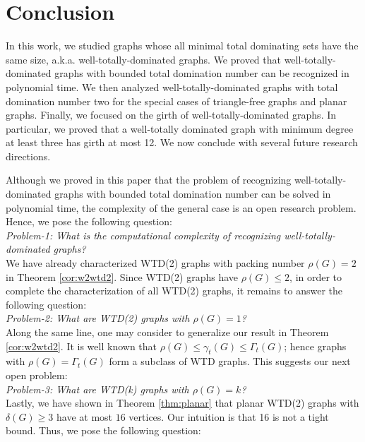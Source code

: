 \documentclass[11pt]{article}
\theoremstyle{definition}
\begin{document}
\section{Conclusion}
In this work, we studied graphs whose all minimal total dominating sets have the same size, a.k.a. well-totally-dominated graphs. We proved that well-totally-dominated graphs with bounded total domination number can be recognized in polynomial time. We then analyzed well-totally-dominated graphs with total domination number two for the special cases of triangle-free graphs and planar graphs. Finally, we focused on the girth of well-totally-dominated graphs. In particular, we proved that a well-totally dominated graph with minimum degree at least three has girth at most 12. We now conclude with several future research directions.

Although we proved in this paper that the problem of recognizing well-totally-dominated graphs with bounded total domination number can be solved in polynomial time, the complexity of the general case is an open research problem. Hence, we pose the following question:\\



\emph{Problem-1: What is the computational complexity of recognizing well-totally-dominated graphs?}\\




We have already characterized WTD(2) graphs with packing number $\rho(G)=2$ in Theorem \ref{cor:w2wtd2}. Since WTD(2) graphs have $\rho(G)\leq 2$, in order to complete the characterization of all WTD(2) graphs, it remains to answer the following question:\\

\emph{Problem-2: What are WTD(2) graphs  with  $\rho(G)=1$?}\\

Along the same line, one may consider to generalize our result in Theorem \ref{cor:w2wtd2}. It is well known that $\rho(G)\leq \gamma_t(G)\leq \Gamma_t(G)$; hence graphs with $\rho(G)=\Gamma_t(G)$ form a subclass of WTD graphs. This suggests our next open problem:\\

\emph{Problem-3: What are WTD(k) graphs  with  $\rho(G)=k$?}\\

Lastly, we have shown in Theorem \ref{thm:planar} that planar WTD(2) graphs with $\delta(G) \geq 3$ have at most $16$ vertices. Our intuition is that 16 is not a tight bound. Thus, we pose the following question:\\
 
\end{document}
